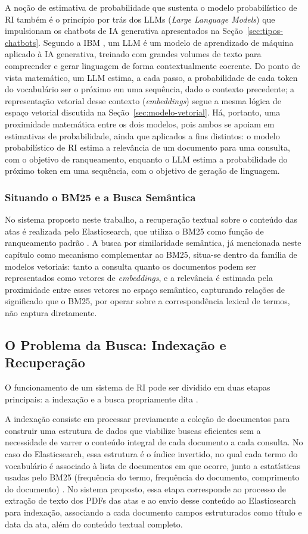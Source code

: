 A noção de estimativa de probabilidade que sustenta o modelo probabilístico de RI também é o princípio por trás dos LLMs (\textit{Large Language Models}) que impulsionam os chatbots de IA generativa apresentados na Seção~\ref{sec:tipos-chatbots}. Segundo a IBM \cite{IBMLLM}, um LLM é um modelo de aprendizado de máquina aplicado à IA generativa, treinado com grandes volumes de texto para compreender e gerar linguagem de forma contextualmente coerente. Do ponto de vista matemático, um LLM estima, a cada passo, a probabilidade de cada token do vocabulário ser o próximo em uma sequência, dado o contexto precedente; a representação vetorial desse contexto (\textit{embeddings}) segue a mesma lógica de espaço vetorial discutida na Seção~\ref{sec:modelo-vetorial}. Há, portanto, uma proximidade matemática entre os dois modelos, pois ambos se apoiam em estimativas de probabilidade, ainda que aplicados a fins distintos: o modelo probabilístico de RI estima a relevância de um documento para uma consulta, com o objetivo de ranqueamento, enquanto o LLM estima a probabilidade do próximo token em uma sequência, com o objetivo de geração de linguagem.

\subsubsection{Situando o BM25 e a Busca Semântica}
No sistema proposto neste trabalho, a recuperação textual sobre o conteúdo das atas é realizada pelo Elasticsearch, que utiliza o BM25 como função de ranqueamento padrão \cite{IBMElasticsearch}. A busca por similaridade semântica, já mencionada neste capítulo como mecanismo complementar ao BM25, situa-se dentro da família de modelos vetoriais: tanto a consulta quanto os documentos podem ser representados como vetores de \textit{embeddings}, e a relevância é estimada pela proximidade entre esses vetores no espaço semântico, capturando relações de significado que o BM25, por operar sobre a correspondência lexical de termos, não captura diretamente.

\subsection{O Problema da Busca: Indexação e Recuperação}\label{sec:problema-busca}

O funcionamento de um sistema de RI pode ser dividido em duas etapas principais: a indexação e a busca propriamente dita \cite{manning2008ir}.

A indexação consiste em processar previamente a coleção de documentos para construir uma estrutura de dados que viabilize buscas eficientes sem a necessidade de varrer o conteúdo integral de cada documento a cada consulta. No caso do Elasticsearch, essa estrutura é o índice invertido, no qual cada termo do vocabulário é associado à lista de documentos em que ocorre, junto a estatísticas usadas pelo BM25 (frequência do termo, frequência do documento, comprimento do documento) \cite{IBMElasticsearch}. No sistema proposto, essa etapa corresponde ao processo de extração de texto dos PDFs das atas e ao envio desse conteúdo ao Elasticsearch para indexação, associando a cada documento campos estruturados como título e data da ata, além do conteúdo textual completo.

